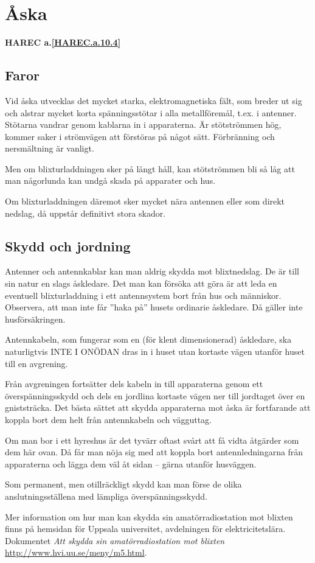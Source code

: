 \section{Åska}
\textbf{
HAREC a.\ref{HAREC.a.10.4}\label{myHAREC.a.10.4}
}

\subsection{Faror}

Vid åska utvecklas det mycket starka, elektromagnetiska fält, som
breder ut sig och alstrar mycket korta spänningsstötar i alla
metallföremål, t.ex. i antenner. Stötarna vandrar genom kablarna in i
apparaterna. Är stötströmmen hög, kommer saker i strömvägen att förstöras
på något sätt. Förbränning och nersmältning är vanligt.

Men om blixturladdningen sker på långt håll, kan stötströmmen bli så låg att
man någorlunda kan undgå skada på apparater och hus.

Om blixturladdningen däremot sker mycket nära antennen eller som direkt nedslag,
då uppstår definitivt stora skador.

\subsection{Skydd och jordning}

Antenner och antennkablar kan man aldrig skydda mot blixtnedslag. De är
till sin natur en slags åskledare. Det man kan försöka att göra är
att leda en eventuell blixturladdning i ett antennsystem bort från hus
och människor. Observera, att man inte får ''haka på'' husets
ordinarie åskledare. Då gäller inte husförsäkringen.

Antennkabeln, som fungerar som en (för klent dimensionerad) åskledare,
ska naturligtvis INTE I ONÖDAN dras in i huset utan kortaste vägen
utanför huset till en avgrening.

Från avgreningen fortsätter dels kabeln in till apparaterna genom ett
överspänningsskydd och dels en jordlina kortaste vägen ner till
jordtaget över en gniststräcka. Det bästa sättet att skydda
apparaterna mot åska är fortfarande att koppla bort dem helt från
antennkabeln och vägguttag.

Om man bor i ett hyreshus är det tyvärr oftast svårt att få vidta
åtgärder som dem här ovan. Då får man nöja sig med att koppla
bort antennledningarna från apparaterna och lägga dem väl åt sidan --
gärna utanför husväggen.

Som permanent, men otillräckligt skydd kan man förse de olika
anslutningsställena med lämpliga överspänningsskydd.

Mer information om hur man kan skydda sin amatörradiostation mot blixten
finns på hemsidan för Uppsala universitet, avdelningen för elektricitetslära.
Dokumentet \emph{Att skydda sin amatörradiostation mot blixten}
\url{http://www.hvi.uu.se/meny/m5.html}.
